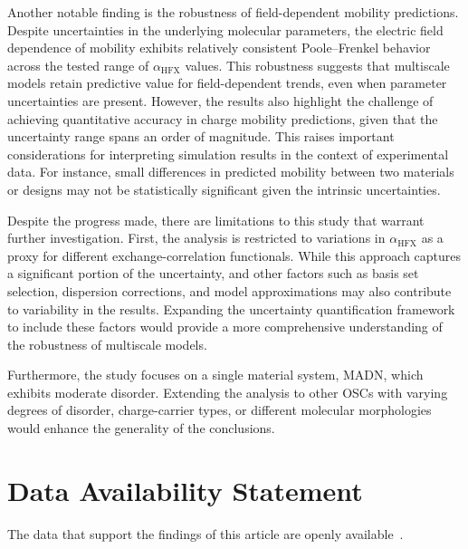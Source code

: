 \documentclass[%
 reprint,
superscriptaddress,
 amsmath,amssymb,
 aps,
prb,
floatfix
]{revtex4-2}
\newcommand{\ahfx}{\ensuremath{\alpha_\text{HFX}}\xspace}
\newcommand{\change}[1]{{\color{blue}{#1}}}
\begin{document}
Another notable finding is the robustness of field-dependent mobility predictions. Despite uncertainties in the underlying molecular parameters, the electric field dependence of mobility exhibits relatively consistent Poole--Frenkel behavior across the tested range of \ahfx values. This robustness suggests that multiscale models retain predictive value for field-dependent trends, even when parameter uncertainties are present. However, the results also highlight the challenge of achieving quantitative accuracy in charge mobility predictions, given that the uncertainty range spans an order of magnitude. This raises important considerations for interpreting simulation results in the context of experimental data. For instance, small differences in predicted mobility between two materials or designs may not be statistically significant given the intrinsic uncertainties.  

Despite the progress made, there are limitations to this study that warrant further investigation. First, the analysis is restricted to variations in \ahfx as a proxy for different exchange-correlation functionals. While this approach captures a significant portion of the uncertainty, \change{other parameters in the definition of exchange-correlation functionals} and other factors such as basis set selection, dispersion corrections, and model approximations may also contribute to variability in the results. Expanding the uncertainty quantification framework to include these factors would provide a more comprehensive understanding of the robustness of multiscale models.  

Furthermore, the study focuses on a single material system, MADN, which exhibits moderate disorder. Extending the analysis to other OSCs with varying degrees of disorder, charge-carrier types, or different molecular morphologies would enhance the generality of the conclusions.  

\section*{Data Availability Statement}
The data that support the findings of this article are openly available~\cite{Baumeier2025}.



\appendix*
\end{document}

